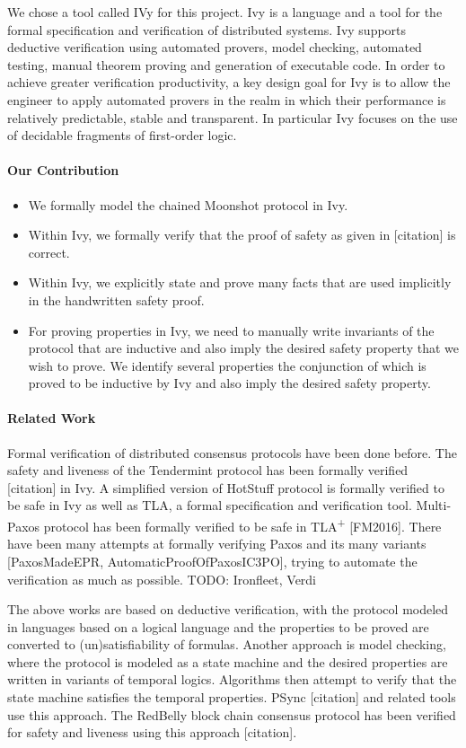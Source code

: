 We chose a tool called IVy for this project. Ivy is a language and a tool for the formal specification and verification of distributed systems. Ivy supports deductive verification using automated provers, model checking, automated testing, manual theorem proving and generation of executable code. In order to achieve greater verification productivity, a key design goal for Ivy is to allow the engineer to apply automated provers in the realm in which their performance is relatively predictable, stable and transparent. In particular Ivy focuses on the use of decidable fragments of first-order logic.

\paragraph{Our Contribution}
\begin{itemize}
	\item We formally model the chained Moonshot protocol in Ivy.
	\item Within Ivy, we formally verify that the proof of safety as given in [citation] is correct.
	\item Within Ivy, we explicitly state and prove many facts that are used implicitly in the handwritten safety proof.
	\item For proving properties in Ivy, we need to manually write invariants of the protocol that are inductive and also imply the desired safety property that we wish to prove. We identify several properties the conjunction of which is proved to be inductive by Ivy and also imply the desired safety property.
\end{itemize}

\paragraph{Related Work} Formal verification of distributed consensus protocols have been done before. The safety and liveness of the Tendermint protocol has been formally verified [citation] in Ivy. A simplified version of HotStuff protocol is formally verified to be safe in Ivy as well as TLA, a formal specification and verification tool. Multi-Paxos protocol has been formally verified to be safe in TLA\textsuperscript{+} [FM2016]. There have been many attempts at formally verifying Paxos and its many variants [PaxosMadeEPR, AutomaticProofOfPaxosIC3PO], trying to automate the verification as much as possible. TODO: Ironfleet, Verdi

The above works are based on deductive verification, with the protocol modeled in languages based on a logical language and the properties to be proved are converted to (un)satisfiability of formulas. Another approach is model checking, where the protocol is modeled as a state machine and the desired properties are written in variants of temporal logics. Algorithms then attempt to verify that the state machine satisfies the temporal properties. PSync [citation] and related tools use this approach. The RedBelly block chain consensus protocol has been verified for safety and liveness using this approach [citation].

